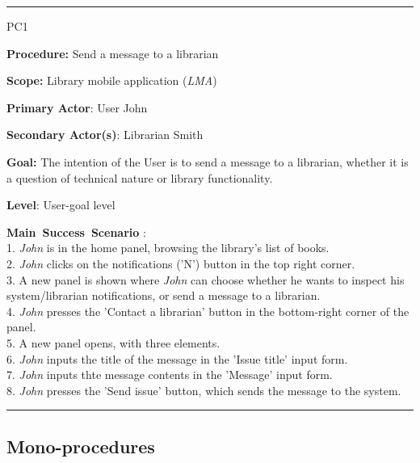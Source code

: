 
\vspace{0.5cm}
\hrule
\begin{lyxlist}{PC1}
\small{
\item [\textbf{Procedure:}] Send a message to a librarian
\item [\textbf{Scope:}] Library mobile application (\emph{LMA})
\item [\textbf{Primary Actor}:] User John
\item [\textbf{Secondary Actor(s)}:] Librarian Smith
\item [\textbf{Goal:}] The intention of the User is to send a message to a
librarian, whether it is a question of technical nature or library
functionality.
\item [\textbf{Level}:] User-goal level
\item [\textbf{Main~Success~Scenario}]:\\
1. \emph{John} is in the home panel, browsing the library's list of books. \\
2. \emph{John} clicks on the notifications ('N') button in the top right corner.
\\
3. A new panel is shown where \emph{John} can choose whether he wants to
inspect his system/librarian notifications, or send a message to a librarian. \\
4. \emph{John} presses the 'Contact a librarian' button in the bottom-right
corner of the panel.
\\
5. A new panel opens, with three elements. \\
6. \emph{John} inputs the title of the message in the 'Issue title' input form.
\\
7. \emph{John} inputs thte message contents in the 'Message' input form. \\
8. \emph{John} presses the 'Send issue' button, which sends the message to the
system. \\

}

\end{lyxlist}
\hrule





\subsection{Mono-procedures}

